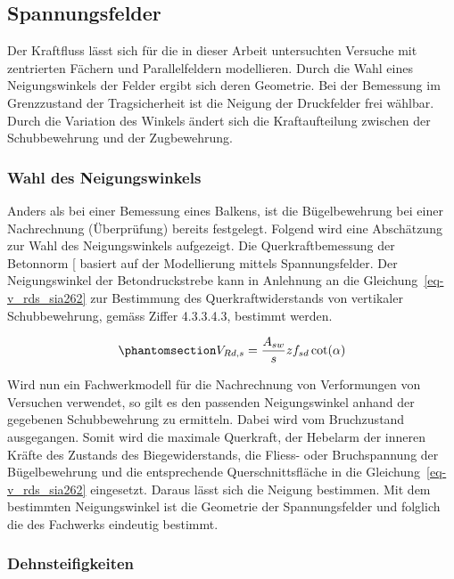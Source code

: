 \documentclass[
  12pt,
  letterpaper,
  egregdoesnotlikesansseriftitles]{scrreprt}
\begin{document}
\subsection{Spannungsfelder}\label{spannungsfelder}

Der Kraftfluss lässt sich für die in dieser Arbeit untersuchten Versuche
mit zentrierten Fächern und Parallelfeldern modellieren. Durch die Wahl
eines Neigungswinkels der Felder ergibt sich deren Geometrie. Bei der
Bemessung im Grenzzustand der Tragsicherheit ist die Neigung der
Druckfelder frei wählbar. Durch die Variation des Winkels ändert sich
die Kraftaufteilung zwischen der Schubbewehrung und der Zugbewehrung.

\subsubsection{Wahl des Neigungswinkels}\label{wahl-des-neigungswinkels}

Anders als bei einer Bemessung eines Balkens, ist die Bügelbewehrung bei
einer Nachrechnung (Überprüfung) bereits festgelegt. Folgend wird eine
Abschätzung zur Wahl des Neigungswinkels aufgezeigt. Die
Querkraftbemessung der Betonnorm {[}\citeproc{ref-SIA2013a}{6}{]}
basiert auf der Modellierung mittels Spannungsfelder. Der Neigungswinkel
der Betondruckstrebe kann in Anlehnung an die
Gleichung~\ref{eq-v_rds_sia262} zur Bestimmung des Querkraftwiderstands
von vertikaler Schubbewehrung, gemäss Ziffer 4.3.3.4.3, bestimmt werden.

\begin{equation}\phantomsection\label{eq-v_rds_sia262}{
V_{Rd,s} = \frac{A_{sw}}{s} z f_{sd} \cot(\alpha)
}\end{equation}

Wird nun ein Fachwerkmodell für die Nachrechnung von Verformungen von
Versuchen verwendet, so gilt es den passenden Neigungswinkel anhand der
gegebenen Schubbewehrung zu ermitteln. Dabei wird vom Bruchzustand
ausgegangen. Somit wird die maximale Querkraft, der Hebelarm der inneren
Kräfte des Zustands des Biegewiderstands, die Fliess- oder Bruchspannung
der Bügelbewehrung und die entsprechende Querschnittsfläche in die
Gleichung~\ref{eq-v_rds_sia262} eingesetzt. Daraus lässt sich die
Neigung bestimmen. Mit dem bestimmten Neigungswinkel ist die Geometrie
der Spannungsfelder und folglich die des Fachwerks eindeutig bestimmt.

\subsubsection{Dehnsteifigkeiten}\label{dehnsteifigkeiten}
\end{document}
